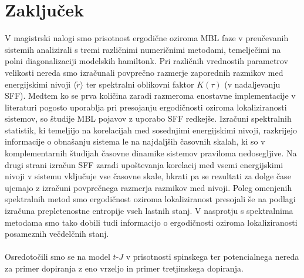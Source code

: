 \chapter{Zaključek}
V magistrski nalogi smo prisotnost ergodične oziroma MBL faze v preučevanih sistemih analizirali s tremi različnimi numeričnimi metodami, temelječimi na polni diagonalizaciji modelskih hamiltonk. Pri različnih vrednostih parametrov velikosti nereda smo izračunali povprečno razmerje zaporednih razmikov med energijskimi nivoji $\langle \tilde{r}\rangle$ ter spektralni oblikovni faktor $K(\tau)$ (v nadaljevanju SFF). Medtem ko se prva količina zaradi razmeroma enostavne implementacije v literaturi pogosto uporablja pri presojanju ergodičnosti oziroma lokaliziranosti sistemov, so študije MBL pojavov z uporabo SFF redkejše. Izračuni spektralnih statistik, ki temeljijo na korelacijah med sosednjimi energijskimi nivoji, razkrijejo informacije o obnašanju sistema le na najdaljših časovnih skalah, ki so v komplementarnih študijah časovne dinamike sistemov praviloma nedosegljive. Na drugi strani izračun SFF zaradi upoštevanja korelacij med vsemi energijskimi nivoji v sistemu vključuje vse časovne skale, hkrati pa se rezultati za dolge čase ujemajo z izračuni povprečnega razmerja razmikov med nivoji. Poleg omenjenih spektralnih metod smo ergodičnost oziroma lokaliziranost presojali še na podlagi izračuna prepletenostne entropije vseh lastnih stanj. V nasprotju s spektralnima metodama smo tako dobili tudi informacijo o ergodičnosti oziroma lokaliziranosti posameznih večdelčnih stanj.\\\\
 Osredotočili smo se na model $t$-$J$ v prisotnosti spinskega ter potencialnega nereda za primer dopiranja z eno vrzeljo in primer tretjinskega dopiranja.
